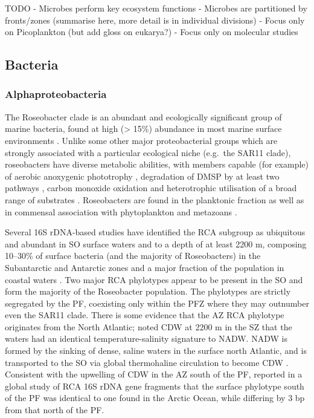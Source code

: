 TODO
  - Microbes perform key ecosystem functions
  - Microbes are partitioned by fronts/zones (summarise here, more detail is in individual divisions)
  - Focus only on Picoplankton (but add gloss on eukarya?)
  - Focus only on molecular studies

\subsection{Bacteria}

\subsubsection{Alphaproteobacteria}


The Roseobacter clade is an abundant and ecologically significant group of marine bacteria, found at high (> 15\%) abundance in most marine surface environments \citep[][and references therein]{Buchan:2005hd}.
Unlike some other major proteobacterial groups which are strongly associated with a particular ecological niche (e.g.\ the SAR11 clade), roseobacters have diverse metabolic abilities, with members capable (for example) of aerobic anoxygenic phototrophy \cite{Biebl:2005fp,Beja:2002gt}, degradation of \ac{DMSP} by at least two pathways \cite{Miller:2004jz,Moran:2003cwa}, carbon monoxide oxidation \cite{King:2003kc} and heterotrophic utilisation of a broad range of substrates \citep[reviewed in][]{Brinkhoff:2008do}.
Roseobacters are found in the planktonic fraction as well as in commensal association with phytoplankton and metazoans \citep[reviewed in][]{Buchan:2005hd}.

Several 16S rDNA-based studies have identified the \ac{RCA} subgroup as ubiquitous and abundant in \ac{SO} surface waters and to a depth of at least 2200 m, composing \textapprox{} 10--30\% of surface bacteria (and the majority of Roseobacters) in the Subantarctic and Antarctic zones \cite{Giebel:2009hr,Murray:2007db,Ghiglione:2011ee} and a major fraction of the population in coastal waters \cite{Murray:2007db,Koh:2011ij}.
Two major \ac{RCA} phylotypes appear to be present in the \ac{SO} and form the majority of the Roseobacter population.
The phylotypes are strictly segregated by the \ac{PF}, coexisting only within the \ac{PFZ} \cite{Selje:2004ka,Giebel:2009hr} where they may outnumber even the SAR11 clade.
There is some evidence that the \ac{AZ} \ac{RCA} phylotype originates from the North Atlantic; \citet{Giebel:2009hr} noted \ac{CDW} at 2200 m in the \ac{SZ} that the waters had an identical temperature-salinity signature to \ac{NADW}.
\ac{NADW} is formed by the sinking of dense, saline waters in the surface north Atlantic, and is transported to the \ac{SO} via global thermohaline circulation to become \ac{CDW} \cite{Callahan:1972tk}.
Consistent with the upwelling of \ac{CDW} in the \ac{AZ} south of the \ac{PF}, \citep{Selje:2004ka} reported in a global study of \ac{RCA} 16S rDNA gene fragments that the surface phylotype south of the \ac{PF} was identical to one found in the Arctic Ocean, while differing by 3 bp from that north of the \ac{PF}.

